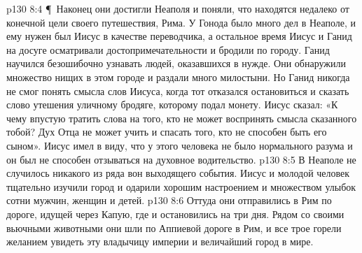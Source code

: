 \vs p130 8:4 \P\ Наконец они достигли Неаполя и поняли, что находятся недалеко от конечной цели своего путешествия, Рима. У Гонода было много дел в Неаполе, и ему нужен был Иисус в качестве переводчика, а остальное время Иисус и Ганид на досуге осматривали достопримечательности и бродили по городу. Ганид научился безошибочно узнавать людей, оказавшихся в нужде. Они обнаружили множество нищих в этом городе и раздали много милостыни. Но Ганид никогда не смог понять смысла слов Иисуса, когда тот отказался остановиться и сказать слово утешения уличному бродяге, которому подал монету. Иисус сказал: «К чему впустую тратить слова на того, кто не может воспринять смысла сказанного тобой? Дух Отца не может учить и спасать того, кто не способен быть его сыном». Иисус имел в виду, что у этого человека не было нормального разума и он был не способен отзываться на духовное водительство.
\vs p130 8:5 В Неаполе не случилось никакого из ряда вон выходящего события. Иисус и молодой человек тщательно изучили город и одарили хорошим настроением и множеством улыбок сотни мужчин, женщин и детей.
\vs p130 8:6 Оттуда они отправились в Рим по дороге, идущей через Капую, где и остановились на три дня. Рядом со своими вьючными животными они шли по Аппиевой дороге в Рим, и все трое горели желанием увидеть эту владычицу империи и величайший город в мире.
